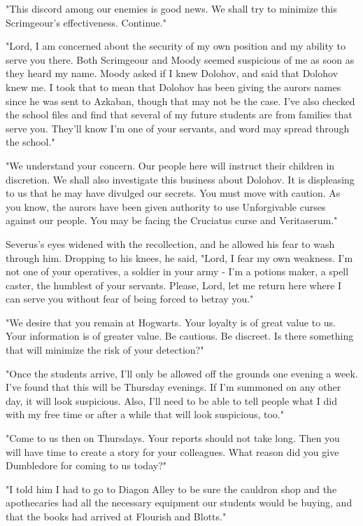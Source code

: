 "This discord among our enemies is good news. We shall try to minimize this Scrimgeour's effectiveness. Continue."

"Lord, I am concerned about the security of my own position and my ability to serve you there. Both Scrimgeour and Moody seemed suspicious of me as soon as they heard my name. Moody asked if I knew Dolohov, and said that Dolohov knew me. I took that to mean that Dolohov has been giving the aurors names since he was sent to Azkaban, though that may not be the case. I've also checked the school files and find that several of my future students are from families that serve you. They'll know I'm one of your servants, and word may spread through the school."

"We understand your concern. Our people here will instruct their children in discretion. We shall also investigate this business about Dolohov. It is displeasing to us that he may have divulged our secrets. You must move with caution. As you know, the aurors have been given authority to use Unforgivable curses against our people. You may be facing the Cruciatus curse and Veritaserum."

Severus's eyes widened with the recollection, and he allowed his fear to wash through him. Dropping to his knees, he said, "Lord, I fear my own weakness. I'm not one of your operatives, a soldier in your army - I'm a potions maker, a spell caster, the humblest of your servants. Please, Lord, let me return here where I can serve you without fear of being forced to betray you."

"We desire that you remain at Hogwarts. Your loyalty is of great value to us. Your information is of greater value. Be cautious. Be discreet. Is there something that will minimize the risk of your detection?"

"Once the students arrive, I'll only be allowed off the grounds one evening a week. I've found that this will be Thursday evenings. If I'm summoned on any other day, it will look suspicious. Also, I'll need to be able to tell people what I did with my free time or after a while that will look suspicious, too."

"Come to us then on Thursdays. Your reports should not take long. Then you will have time to create a story for your{\el} colleagues. What reason did you give Dumbledore for coming to us today?"

"I told him I had to go to Diagon Alley to be sure the cauldron shop and the apothecaries had all the necessary equipment our students would be buying, and that the books had arrived at Flourish and Blotts."

